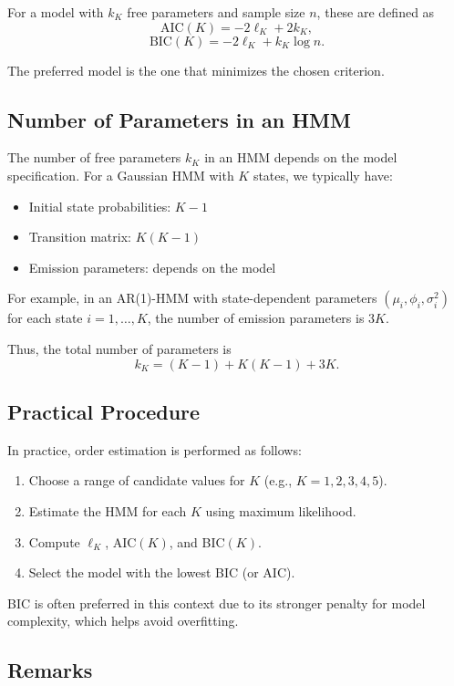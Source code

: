\documentclass[11pt]{article}
\begin{document}
For a model with $k_K$ free parameters and sample size $n$, these are defined as
\[
\text{AIC}(K) = -2 \ell_K + 2 k_K,
\]
\[
\text{BIC}(K) = -2 \ell_K + k_K \log n.
\]

The preferred model is the one that minimizes the chosen criterion.

\subsection{Number of Parameters in an HMM}

The number of free parameters $k_K$ in an HMM depends on the model specification. For a Gaussian HMM with $K$ states, we typically have:

\begin{itemize}
    \item Initial state probabilities: $K - 1$
    \item Transition matrix: $K(K - 1)$
    \item Emission parameters: depends on the model
\end{itemize}

For example, in an AR(1)-HMM with state-dependent parameters $(\mu_i, \phi_i, \sigma_i^2)$ for each state $i = 1, \dots, K$, the number of emission parameters is $3K$.

Thus, the total number of parameters is
\[
k_K = (K - 1) + K(K - 1) + 3K.
\]

\subsection{Practical Procedure}

In practice, order estimation is performed as follows:

\begin{enumerate}
    \item Choose a range of candidate values for $K$ (e.g., $K = 1, 2, 3, 4, 5$).
    \item Estimate the HMM for each $K$ using maximum likelihood.
    \item Compute $\ell_K$, AIC$(K)$, and BIC$(K)$.
    \item Select the model with the lowest BIC (or AIC).
\end{enumerate}

BIC is often preferred in this context due to its stronger penalty for model complexity, which helps avoid overfitting.

\subsection{Remarks}
\end{document}

